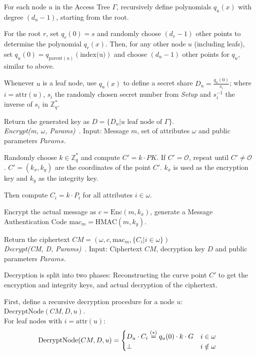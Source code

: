 For each node $u$ in the Access Tree $\Gamma$, recursively define polynomials $q_u(x)$ with degree $(d_u - 1)$, starting from the root.

For the root $r$, set $q_r(0) = s$ and randomly choose $(d_r - 1)$ other points to determine the polynomial $q_r(x)$.
Then, for any other node $u$ (including leafs), set $q_u(0) = q_{\text{parent}(u)}(\text{index(u)})$ and choose $(d_u -1)$ other points for $q_u$, similar to above.

Whenever $u$ is a leaf node, use $q_u(x)$ to define a secret share $D_u = \frac{q_u(0)}{s_i}$; where $i = \text{attr}(u)$, $s_i$ the randomly chosen secret number from \emph{Setup} and $s_i^{-1}$ the inverse of $s_i$ in $\mathbb{Z}_q^*$.

Return the generated key as $D = \{D_u | u \text{ leaf node of } \Gamma\}$.\\

\emph{Encrypt(m, $\omega$, Params)}~\cite{yao_lightweight_2015}.
Input: Message $m$, set of attributes $\omega$ and public parameters $Params$.

Randomly choose $k \in \mathbb{Z}_q^*$ and compute $C' = k \cdot PK$. If $C' = \mathcal{O}$, repeat until $C' \neq \mathcal{O}$.
$C' = (k_x, k_y)$ are the coordinates of the point $C'$. $k_x$ is used as the encryption key and $k_y$ as the integrity key.

Then compute $C_i = k \cdot P_i$ for all attributes $i \in \omega$.

Encrypt the actual message as $c = \text{Enc}(m, k_x)$, generate a Message Authentication Code $\text{mac}_m = \text{HMAC}(m, k_y)$.

Return the ciphertext $CM = (\omega, c, \text{mac}_m, \{C_i | i \in \omega\})$\\

\emph{Decrypt(CM, D, Params)}~\cite{yao_lightweight_2015}. Input: Ciphertext $CM$, decryption key $D$ and public parameters $Params$.

Decryption is split into two phases: Reconstructing the curve point $C'$ to get the encryption and integrity keys, and actual decryption of the ciphertext.

First, define a recursive decryption procedure for a node $u$: $\text{DecryptNode}(CM, D, u)$. \\ %
For leaf nodes with $i = \text{attr}(u)$:
\begin{equation*}
    \text{DecryptNode}(CM, D, u) = \begin{cases}
        D_u \cdot C_i \stackrel{(*)}{=} q_u(0) \cdot k \cdot G & i \in \omega\\
        \perp & i \notin \omega
    \end{cases}\\
\end{equation*}

